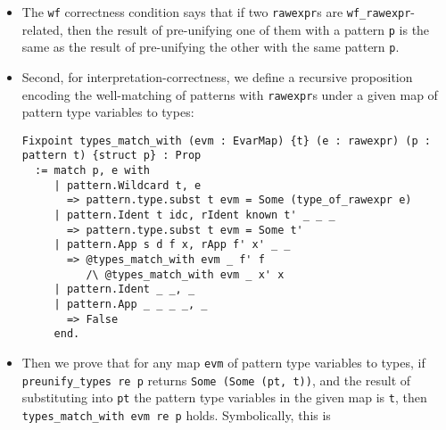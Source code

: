 \documentclass[
]{article}
\begin{document}
\begin{itemize}
\begin{itemize}
\begin{itemize}
\begin{itemize}
        \begin{itemize}
        \item
          The \texttt{wf} correctness condition says that if two
          \texttt{rawexpr}s are \texttt{wf\_rawexpr}-related, then the
          result of pre-unifying one of them with a pattern \texttt{p}
          is the same as the result of pre-unifying the other with the
          same pattern \texttt{p}.
        \item
          Second, for interpretation-correctness, we define a recursive
          proposition encoding the well-matching of patterns with
          \texttt{rawexpr}s under a given map of pattern type variables
          to types:

\begin{verbatim}
Fixpoint types_match_with (evm : EvarMap) {t} (e : rawexpr) (p : pattern t) {struct p} : Prop
  := match p, e with
     | pattern.Wildcard t, e
       => pattern.type.subst t evm = Some (type_of_rawexpr e)
     | pattern.Ident t idc, rIdent known t' _ _ _
       => pattern.type.subst t evm = Some t'
     | pattern.App s d f x, rApp f' x' _ _
       => @types_match_with evm _ f' f
          /\ @types_match_with evm _ x' x
     | pattern.Ident _ _, _
     | pattern.App _ _ _ _, _
       => False
     end.
\end{verbatim}
        \item
          Then we prove that for any map \texttt{evm} of pattern type
          variables to types, if \texttt{preunify\_types\ re\ p} returns
          \texttt{Some\ (Some\ (pt,\ t\textquotesingle{}))}, and the
          result of substituting into \texttt{pt} the pattern type
          variables in the given map is \texttt{t\textquotesingle{}},
          then \texttt{types\_match\_with\ evm\ re\ p} holds.
          Symbolically, this is


\end{itemize}
\end{itemize}
\end{itemize}
\end{itemize}
\end{itemize}
\end{document}
